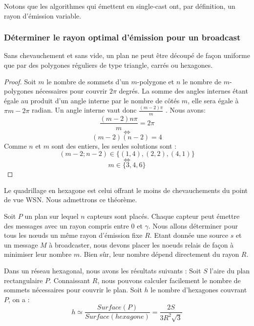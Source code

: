 Notons que les algorithmes qui émettent en single-cast ont, par définition, un rayon d'émission variable.

\subsubsection{Déterminer le rayon optimal d'émission pour un broadcast}
\begin{myth}
Sans chevauchement et sans vide, un plan ne peut être découpé de façon uniforme que par des polygones réguliers de type triangle, carrés ou hexagones.
\end{myth}
\begin{proof}
Soit $m$ le nombre de sommets d'un $m$-polygone et $n$ le nombre de $m$-polygones nécessaires pour couvrir $2\pi$ degrés. La somme des angles internes étant égale au produit d'un 
angle interne par le nombre de côtés $m$, elle sera égale à $\pi m-2 \pi$  radian. Un angle interne vaut donc $\frac{(m-2)\pi }{m}$ . Nous avons: 
$$\frac{(m-2)n\pi}{m}=2\pi$$
$$\Leftrightarrow$$
$$(m-2)(n-2)=4$$
Comme $n$ et $m$ sont des entiers, les seules solutions sont : 
$$(m-2;n-2)\in\{(1,4),(2,2),(4,1) \}$$
$$\Leftrightarrow$$
$$m \in \{ 3,4,6 \}$$
\end{proof}

\begin{myth}
Le quadrillage en hexagone est celui offrant le moins de chevauchements du point de vue WSN. Nous admettrons ce théorème.
\end{myth}

Soit $P$ un plan sur lequel $n$ capteurs sont placés. Chaque capteur peut émettre des messages avec un rayon compris entre 0 et $\gamma$. Nous allons déterminer pour tous les nœuds un même rayon d'émission fixe $R$.
Etant donnée une source $s$ et un message $M$ à broadcaster, nous devons placer les noeuds relais de façon à minimiser leur nombre $m$. Bien sûr, leur nombre dépend directement du rayon $R$.
 

Dans un réseau hexagonal, nous avons les résultats suivants :
Soit $S$ l'aire du plan rectangulaire $P$. Connaissant $R$, nous pouvons calculer facilement le nombre de sommets nécessaires pour couvrir le plan.
Soit $h$ le nombre d'hexagones couvrant $P$, on a : 
$$h \simeq \frac{Surface ( P)}{Surface(hexagone)}=\frac{2S}{3R^2 \sqrt{3}}$$

